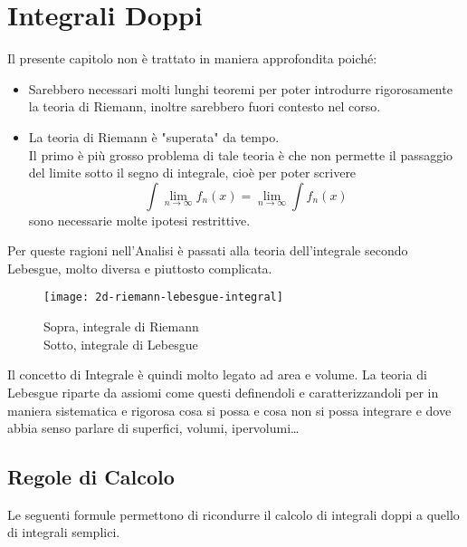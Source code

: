 \chapter{Integrali Doppi}
Il presente capitolo non è trattato in maniera approfondita poiché:
\begin{itemize}
	\item Sarebbero necessari molti lunghi teoremi per poter introdurre rigorosamente la teoria di Riemann, inoltre sarebbero fuori contesto nel corso.
	\item La teoria di Riemann è "superata" da tempo.\\
		Il primo è più grosso problema di tale teoria è che non permette il passaggio del limite sotto il segno di integrale, cioè per poter scrivere 
		\[ \int\lim\limits_{n\to\infty}f_n(x) = \lim\limits_{n\to\infty}\int f_n(x)\]
		sono necessarie molte ipotesi restrittive.
\end{itemize}
Per queste ragioni nell'Analisi è passati alla teoria dell'integrale secondo Lebesgue, molto diversa e piuttosto complicata.
\begin{figure}[H]
	\centering
	\texttt{[image: 2d-riemann-lebesgue-integral]}
	\caption{Sopra, integrale di Riemann\\Sotto, integrale di Lebesgue}
\end{figure}

Il concetto di Integrale è quindi molto legato ad area e volume. La teoria di Lebesgue riparte da assiomi come questi definendoli e caratterizzandoli per in maniera sistematica e rigorosa cosa si possa e cosa non si possa integrare e dove abbia senso parlare di superfici, volumi, ipervolumi\dots

\newpage
\section{Regole di Calcolo}
Le seguenti formule permettono di ricondurre il calcolo di integrali doppi a quello di integrali semplici.

